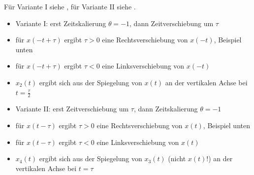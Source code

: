 \begin{Loesung}
Für Variante I siehe , für Variante II siehe
.
%
\begin{itemize}
\setlength\itemsep{-0.5em}
\item Variante I: erst Zeitskalierung $\theta=-1$, dann Zeitverschiebung um $\tau$
\item für $x(-t+\tau)$ ergibt $\tau > 0$ eine Rechtsverschiebung von $x(-t)$, Beispiel unten
\item für $x(-t+\tau)$ ergibt $\tau < 0$ eine Linksverschiebung von $x(-t)$
\item $x_2(t)$ ergibt sich aus der Spiegelung von $x(t)$ an der vertikalen Achse bei $t=\frac{\tau}{2}$
\end{itemize}
%
\vspace{-1em}
%
\begin{itemize}
\setlength\itemsep{-0.5em}
\item Variante II: erst Zeitverschiebung um $\tau$, dann Zeitskalierung $\theta=-1$
\item für $x(t-\tau)$ ergibt $\tau > 0$ eine Rechtsverschiebung von $x(t)$, Beispiel unten
\item für $x(t-\tau)$ ergibt $\tau < 0$ eine Linksverschiebung von $x(t)$
\item $x_4(t)$ ergibt sich aus der Spiegelung von $x_3(t)$ (nicht $x(t)$!) an der vertikalen Achse bei $t=\tau$
\end{itemize}
\end{Loesung}

